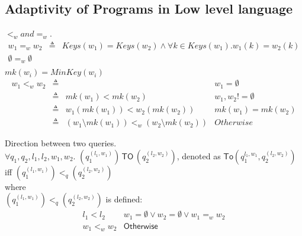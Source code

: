 \documentclass[a4paper,11pt]{article}
\begin{document}
\subsection{Adaptivity of Programs in Low level language}
%
%
\begin{defn}
$<_w and =_w$.\\
\[
  \begin{array}{lll}
     w_1 =_w w_2  &  \triangleq &  Keys(w_1) = Keys(w_2) \land \forall k \in Keys(w_1). w_1(k) = w_2(k) \\
     \emptyset =_w \emptyset & &   \\
  \end{array}
\] 
$mk(w_i) =MinKey(w_i) $ 
\[
\begin{array}{lllr}
     w_1 <_w w_2 & \triangleq & & w_1 = \emptyset \\
     & \triangleq  & mk(w_1) < mk(w_2) & w_1,w_2 != \emptyset  \\
     & \triangleq & w_1(mk(w_1)) < w_2(mk(w_2))   & mk(w_1) = mk(w_2) \\
     & \triangleq & (w_1 \setminus mk(w_1) ) <_w (w_2 \setminus mk(w_2)) & Otherwise
\end{array}
\]
\end{defn}
%
\begin{defn}
Direction between two queries.
\\
$\forall q_1,q_2, l_1, l_2, w_1, w_2 $.
$(q_1^{(l_1, w_1)}) \, \mathsf{TO} \, (q_2^{(l_2,w_2)})$,
denoted as $\mathsf{To}(q_1^{l_1, w_1}, q_2^{(l_2,w_2)})$ \\ iff $(q_1^{(l_1, w_1)}) <_q (q_2^{(l_2, w_2)})  $\\
where \\
$(q_1^{(l_1, w_1)}) <_q (q_2^{(l_2, w_2)})$ is defined:\\
\[
\begin{array}{ll}
    l_1 < l_2  & w_1=\emptyset \lor w_2 = \emptyset \lor w_1 =_w w_2   \\
    w_1 <_w w_2    & \mathsf{Otherwise}
\end{array}  
\]
\end{defn}
%
\end{document}
